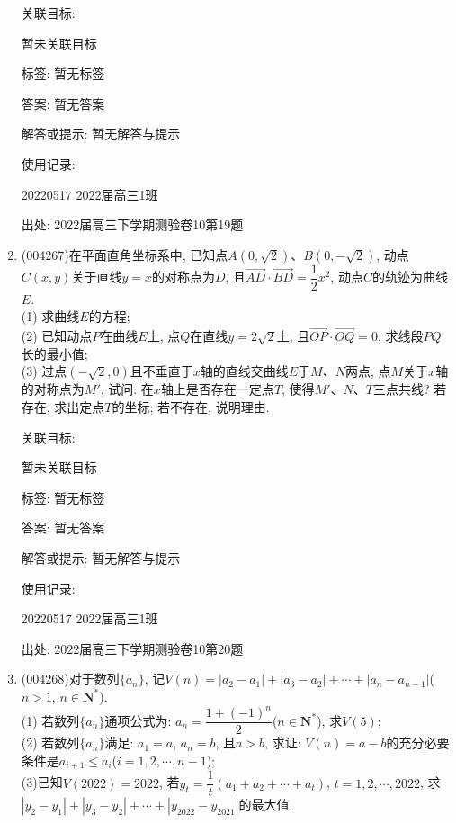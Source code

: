 \documentclass[10pt,a4paper]{article}
\begin{document}
\begin{enumerate}[1.]
关联目标:

暂未关联目标



标签: 暂无标签

答案: 暂无答案

解答或提示: 暂无解答与提示

使用记录:

20220517	2022届高三1班		


出处: 2022届高三下学期测验卷10第19题
\item { (004267)}在平面直角坐标系中, 已知点$A(0,\sqrt 2)$、$B(0,-\sqrt 2)$, 动点$C(x,y)$关于直线$y=x$的对称点为$D$, 且$\overrightarrow{AD}\cdot \overrightarrow{BD}=\dfrac 12{x^2}$, 动点$C$的轨迹为曲线$E$.\\
(1) 求曲线$E$的方程;\\
(2) 已知动点$P$在曲线$E$上, 点$Q$在直线$y=2\sqrt 2$上, 且$\overrightarrow{OP}\cdot \overrightarrow{OQ}=0$, 求线段$PQ$长的最小值;\\
(3) 过点$(-\sqrt 2,0)$且不垂直于$x$轴的直线交曲线$E$于$M$、$N$两点, 点$M$关于$x$轴的对称点为$M'$, 试问: 在$x$轴上是否存在一定点$T$, 使得$M'$、$N$、$T$三点共线? 若存在, 求出定点$T$的坐标; 若不存在, 说明理由.


关联目标:

暂未关联目标



标签: 暂无标签

答案: 暂无答案

解答或提示: 暂无解答与提示

使用记录:

20220517	2022届高三1班			


出处: 2022届高三下学期测验卷10第20题
\item { (004268)}对于数列$\{a_n\}$, 记$V(n)=|a_2-a_1|+|a_3-a_2|+\cdots +|a_n-a_{n-1}|$($n>1$, $n\in \mathbf{N}^*$).\\
(1) 若数列$\{a_n\}$通项公式为: $a_n=\dfrac{1+(-1)^n}2$($n\in \mathbf{N}^*$), 求$V(5)$;\\
(2) 若数列$\{a_n\}$满足: $a_1=a$, $a_n=b$, 且$a>b$, 求证: $V(n)=a-b$的充分必要条件是$a_{i+1}\le a_i$($i=1,2,\cdots,n-1$);\\
(3)已知$V(2022)=2022$, 若$y_t=\dfrac 1t(a_1+a_2+\cdots +a_t)$, $t=1,2,\cdots,2022$, 求$|y_2-y_1|+|y_3-y_2|+\cdots +|y_{2022}-y_{2021}|$的最大值.



\end{enumerate}
\end{document}
